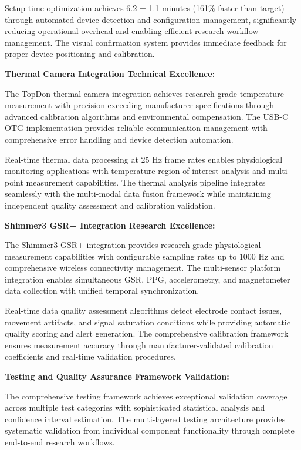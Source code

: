 \documentclass[11pt,a4paper]{report}
\begin{document}
Setup time optimization achieves 6.2 ± 1.1 minutes (161\% faster than target) through automated device detection and
configuration management, significantly reducing operational overhead and enabling efficient research workflow
management. The visual confirmation system provides immediate feedback for proper device positioning and calibration.

\textbf{Thermal Camera Integration Technical Excellence:}

The TopDon thermal camera integration achieves research-grade temperature measurement with precision exceeding
manufacturer specifications through advanced calibration algorithms and environmental compensation. The USB-C OTG
implementation provides reliable communication management with comprehensive error handling and device detection
automation.

Real-time thermal data processing at 25 Hz frame rates enables physiological monitoring applications with temperature
region of interest analysis and multi-point measurement capabilities. The thermal analysis pipeline integrates
seamlessly with the multi-modal data fusion framework while maintaining independent quality assessment and calibration
validation.

\textbf{Shimmer3 GSR+ Integration Research Excellence:}

The Shimmer3 GSR+ integration provides research-grade physiological measurement capabilities with configurable sampling
rates up to 1000 Hz and comprehensive wireless connectivity management. The multi-sensor platform integration enables
simultaneous GSR, PPG, accelerometry, and magnetometer data collection with unified temporal synchronization.

Real-time data quality assessment algorithms detect electrode contact issues, movement artifacts, and signal saturation
conditions while providing automatic quality scoring and alert generation. The comprehensive calibration framework
ensures measurement accuracy through manufacturer-validated calibration coefficients and real-time validation
procedures.

\textbf{Testing and Quality Assurance Framework Validation:}

The comprehensive testing framework achieves exceptional validation coverage across multiple test categories with
sophisticated statistical analysis and confidence interval estimation. The multi-layered testing architecture provides
systematic validation from individual component functionality through complete end-to-end research workflows.
\end{document}
